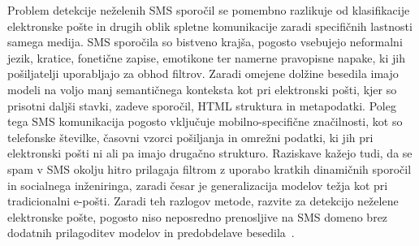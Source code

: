 \documentclass[sigconf,nonacm]{acmart}
\begin{document}
    Problem detekcije neželenih SMS sporočil se pomembno razlikuje od klasifikacije elektronske 
    pošte in drugih oblik spletne komunikacije zaradi specifičnih lastnosti samega medija. SMS 
    sporočila so bistveno krajša, pogosto vsebujejo neformalni jezik, kratice, fonetične zapise, 
    emotikone ter namerne pravopisne napake, ki jih pošiljatelji uporabljajo za obhod filtrov. 
    Zaradi omejene dolžine besedila imajo modeli na voljo manj semantičnega konteksta kot pri elektronski pošti, 
    kjer so prisotni daljši stavki, zadeve sporočil, HTML struktura in metapodatki. 
    Poleg tega SMS komunikacija pogosto vključuje mobilno-specifične značilnosti, kot so telefonske številke, 
    časovni vzorci pošiljanja in omrežni podatki, ki jih pri elektronski pošti ni ali pa imajo drugačno strukturo. 
    Raziskave kažejo tudi, da se spam v SMS okolju hitro prilagaja filtrom z uporabo kratkih dinamičnih sporočil in socialnega inženiringa, 
    zaradi česar je generalizacija modelov težja kot pri tradicionalni e-pošti. Zaradi teh razlogov metode, 
    razvite za detekcijo neželene elektronske pošte, pogosto niso neposredno prenosljive na SMS domeno brez dodatnih prilagoditev modelov 
    in predobdelave besedila~\cite{filali2026cross}.



    
\end{document}
